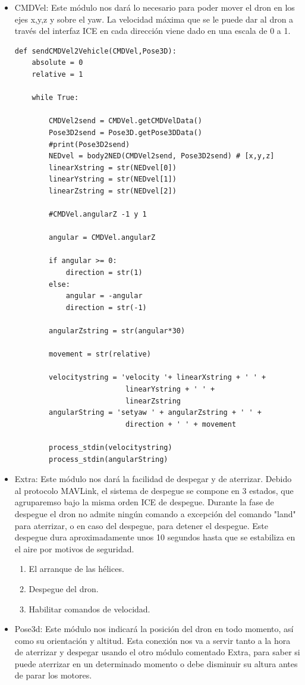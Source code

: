 \begin{itemize}
\item CMDVel: Este módulo nos dará lo necesario para poder mover el dron en los ejes x,y,z y sobre el yaw. La velocidad máxima que se le puede dar al dron a través del interfaz ICE en cada dirección viene dado en una escala de 0 a 1.  
\begin{lstlisting}[frame=single]
def sendCMDVel2Vehicle(CMDVel,Pose3D):
    absolute = 0
    relative = 1

    while True:

        CMDVel2send = CMDVel.getCMDVelData()
        Pose3D2send = Pose3D.getPose3DData()
        #print(Pose3D2send)
        NEDvel = body2NED(CMDVel2send, Pose3D2send) # [x,y,z]
        linearXstring = str(NEDvel[0])
        linearYstring = str(NEDvel[1])
        linearZstring = str(NEDvel[2])

        #CMDVel.angularZ -1 y 1

        angular = CMDVel.angularZ

        if angular >= 0:
            direction = str(1)
        else:
            angular = -angular
            direction = str(-1)

        angularZstring = str(angular*30)

        movement = str(relative)

        velocitystring = 'velocity '+ linearXstring + ' ' + 
        				  linearYstring + ' ' + 
                          linearZstring
        angularString = 'setyaw ' + angularZstring + ' ' + 
        				  direction + ' ' + movement

        process_stdin(velocitystring) 
        process_stdin(angularString)
\end{lstlisting}
\item Extra: Este módulo nos dará la facilidad de despegar y de aterrizar. Debido al protocolo MAVLink, el sistema de despegue se compone en 3 estados, que agruparemso bajo la misma orden ICE de despegue. Durante la fase de despegue el dron no admite ningún comando a excepción del comando "land" para aterrizar, o en caso del despegue, para detener el despegue.  Este despegue dura aproximadamente unos 10 segundos hasta que se estabiliza en el aire por motivos de seguridad. \begin{enumerate}
						\item El arranque de las hélices. 
                        \item Despegue del dron.
                        \item Habilitar comandos de velocidad.
						\end{enumerate}
\item Pose3d: Este módulo nos indicará la posición del dron en todo momento, así como su orientación y altitud. Esta conexión nos va a servir tanto a la hora de aterrizar y despegar usando el otro módulo comentado Extra, para saber si puede aterrizar en un determinado momento o debe disminuir su altura antes de parar los motores.

\end{itemize}


